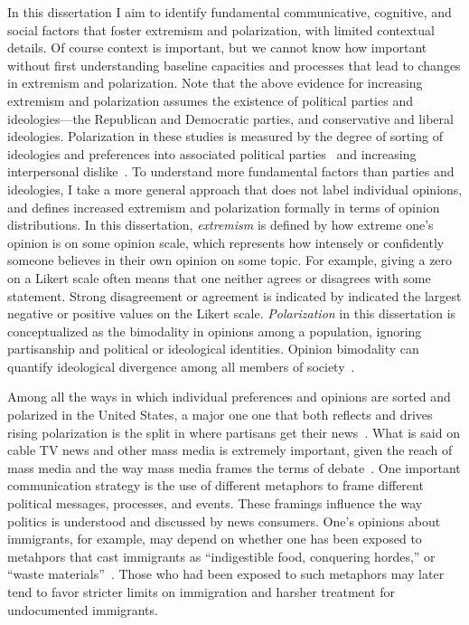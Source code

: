 \documentclass[12pt,letterpaper]{article}
\begin{document}
In this dissertation I aim to identify fundamental communicative, cognitive, and
social factors that foster extremism and polarization, with limited contextual
details. Of course context is important, but we cannot know how important without
first understanding baseline capacities and processes that lead to changes in
extremism and polarization. Note that the above evidence
for increasing extremism and polarization
assumes the existence of political parties and ideologies---the 
Republican and Democratic parties, and conservative and liberal ideologies.
Polarization in these studies is measured by the degree of sorting of ideologies and preferences
into associated political parties~\cite{Mason2015} and increasing interpersonal 
dislike~\cite{Iyengar2019}. To understand more fundamental factors than 
parties and ideologies, I take a more general approach that does not label 
individual opinions, and defines increased extremism and polarization formally
in terms of opinion distributions. In this dissertation, \emph{extremism} is 
defined by how extreme one's opinion is on some opinion 
scale, which represents how intensely or confidently someone believes in their
own opinion on some topic.  For example, giving a zero on a Likert scale often means that one 
neither agrees or disagrees with some statement. Strong disagreement or agreement
is indicated by indicated the largest negative or positive values on the Likert
scale. \emph{Polarization} in this dissertation is 
conceptualized as the bimodality in opinions among a population, ignoring 
partisanship and political or ideological identities. Opinion bimodality
can quantify ideological divergence among all members of 
society~\cite{Bramson2016,Lelkes2016}. 

Among all the ways in which individual preferences and opinions are sorted and 
polarized in the United States, a
major one one that both reflects and drives rising polarization is the split in
where partisans get their news~\cite{Pew2014PolarizationAndMediaHabits,Martin2017}. 
What is said on cable TV news and other mass media is extremely important, given
the reach of mass media and the way mass media frames the terms of debate~\cite{Chong2007}.
One important communication strategy is the use of different 
metaphors to frame different political
messages, processes, and events. These framings influence the way politics is 
understood and discussed by news consumers. One's opinions about immigrants, for example, may depend
on whether one has been exposed to metahpors that cast immigrants as 
``indigestible food, conquering hordes,'' or ``waste materials''~\cite{OBrien2003}.
Those who had been exposed to such metaphors may later tend to favor stricter limits
on immigration and harsher treatment for undocumented immigrants.
\end{document}
